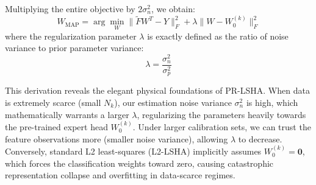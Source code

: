 \documentclass{article}
\theoremstyle{plain}
\theoremstyle{definition}
\theoremstyle{remark}
\begin{document}
Multiplying the entire objective by $2\sigma^2_n$, we obtain:
\begin{equation}
    W_{\text{MAP}} = \arg\min_{W} \|\tilde{F} W^T - Y\|_F^2 + \lambda \|W - W_0^{(k)}\|_F^2
\end{equation}
where the regularization parameter $\lambda$ is exactly defined as the ratio of noise variance to prior parameter variance:
\begin{equation}
    \lambda = \frac{\sigma^2_n}{\sigma^2_p}
\end{equation}

This derivation reveals the elegant physical foundations of PR-LSHA. When data is extremely scarce (small $N_k$), our estimation noise variance $\sigma^2_n$ is high, which mathematically warrants a larger $\lambda$, regularizing the parameters heavily towards the pre-trained expert head $W_0^{(k)}$. Under larger calibration sets, we can trust the feature observations more (smaller noise variance), allowing $\lambda$ to decrease. Conversely, standard L2 least-squares (L2-LSHA) implicitly assumes $W_0^{(k)} = \mathbf{0}$, which forces the classification weights toward zero, causing catastrophic representation collapse and overfitting in data-scarce regimes.
\end{document}
